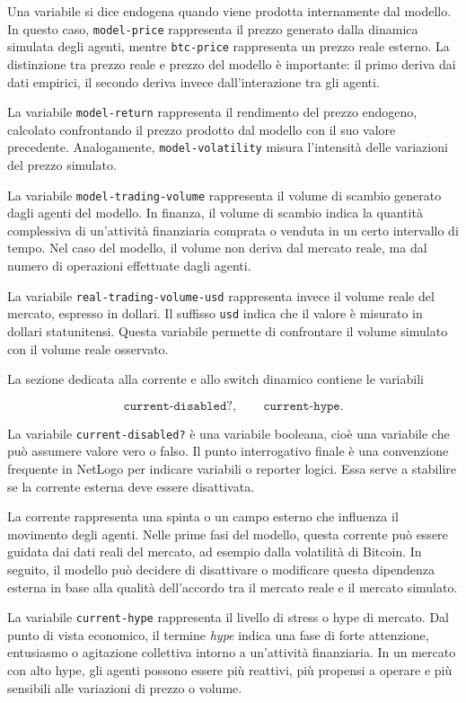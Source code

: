 Una variabile si dice endogena quando viene prodotta internamente dal modello. In
questo caso, \texttt{model-price} rappresenta il prezzo generato dalla dinamica
simulata degli agenti, mentre \texttt{btc-price} rappresenta un prezzo reale
esterno. La distinzione tra prezzo reale e prezzo del modello è importante:
il primo deriva dai dati empirici, il secondo deriva invece dall'interazione tra
gli agenti.

La variabile \texttt{model-return} rappresenta il rendimento del prezzo endogeno,
calcolato confrontando il prezzo prodotto dal modello con il suo valore
precedente. Analogamente, \texttt{model-volatility} misura l'intensità delle
variazioni del prezzo simulato.

La variabile \texttt{model-trading-volume} rappresenta il volume di scambio
generato dagli agenti del modello. In finanza, il volume di scambio indica la
quantità complessiva di un'attività finanziaria comprata o venduta in un certo
intervallo di tempo. Nel caso del modello, il volume non deriva dal mercato reale,
ma dal numero di operazioni effettuate dagli agenti.

La variabile \texttt{real-trading-volume-usd} rappresenta invece il volume reale
del mercato, espresso in dollari. Il suffisso \texttt{usd} indica che il valore è
misurato in dollari statunitensi. Questa variabile permette di confrontare il
volume simulato con il volume reale osservato.

La sezione dedicata alla corrente e allo switch dinamico contiene le variabili

\[
\texttt{current-disabled?},
\qquad
\texttt{current-hype}.
\]

La variabile \texttt{current-disabled?} è una variabile booleana, cioè una
variabile che può assumere valore vero o falso. Il punto interrogativo finale è
una convenzione frequente in NetLogo per indicare variabili o reporter logici.
Essa serve a stabilire se la corrente esterna deve essere disattivata.

La corrente rappresenta una spinta o un campo esterno che influenza il movimento
degli agenti. Nelle prime fasi del modello, questa corrente può essere guidata
dai dati reali del mercato, ad esempio dalla volatilità di Bitcoin. In seguito,
il modello può decidere di disattivare o modificare questa dipendenza esterna in
base alla qualità dell'accordo tra il mercato reale e il mercato simulato.

La variabile \texttt{current-hype} rappresenta il livello di stress o hype di
mercato. Dal punto di vista economico, il termine \textit{hype} indica una fase
di forte attenzione, entusiasmo o agitazione collettiva intorno a un'attività
finanziaria. In un mercato con alto hype, gli agenti possono essere più reattivi,
più propensi a operare e più sensibili alle variazioni di prezzo o volume.

